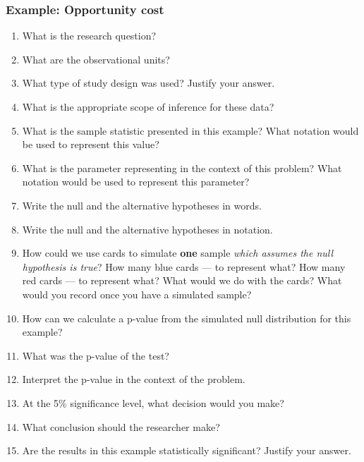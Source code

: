 \documentclass[
]{report}
\newcommand{\rgs}{\vspace{12pt}} %
\begin{document}
\hypertarget{example-opportunity-cost}{%
\subsubsection*{Example: Opportunity cost}\label{example-opportunity-cost}}

\begin{enumerate}
\def\labelenumi{\arabic{enumi}.}
\item
  What is the research question?
  \rgs
\item
  What are the observational units?
  \rgs
\item
  What type of study design was used? Justify your answer.
  \rgs
\item
  What is the appropriate scope of inference for these data?
  \rgs
\item
  What is the sample statistic presented in this example? What notation would be used to represent this value?
  \rgs
\item
  What is the parameter representing in the context of this problem? What notation would be used to represent this parameter?
  \rgs
  \rgs
\item
  Write the null and the alternative hypotheses in words.
  \rgs
  \rgs
\item
  Write the null and the alternative hypotheses in notation.
  \rgs
\item
  How could we use cards to simulate \textbf{one} sample \emph{which assumes the null hypothesis is true}? How many blue cards --- to represent what? How many red cards --- to represent what? What would we do with the cards? What would you record once you have a simulated sample?
  \rgs
  \rgs
  \rgs
\item
  How can we calculate a p-value from the simulated null distribution for this example?
  \rgs
  \rgs
\item
  What was the p-value of the test?
  \rgs
\item
  Interpret the p-value in the context of the problem.
  \rgs
  \rgs
\item
  At the 5\% significance level, what decision would you make?
  \rgs
\item
  What conclusion should the researcher make?
  \rgs
\item
  Are the results in this example statistically significant? Justify your answer.
  \rgs
\end{enumerate}
\end{document}
